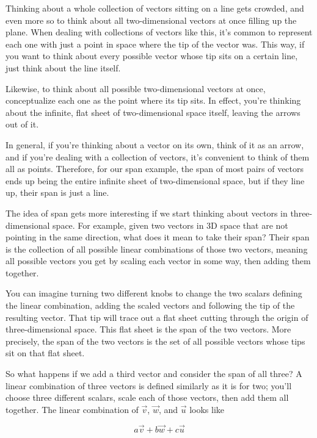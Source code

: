 Thinking about a whole collection of vectors sitting on a line gets crowded, and
even more so to think about all two-dimensional vectors at once filling up the
plane. When dealing with collections of vectors like this, it's common to
represent each one with just a point in space where the tip of the vector was.
This way, if you want to think about every possible vector whose tip sits on a
certain line, just think about the line itself.

Likewise, to think about all possible two-dimensional vectors at once,
conceptualize each one as the point where its tip sits. In effect, you're
thinking about the infinite, flat sheet of two-dimensional space itself, leaving
the arrows out of it.

In general, if you're thinking about a vector on its own, think of it as an
arrow, and if you're dealing with a collection of vectors, it's convenient to
think of them all as points. Therefore, for our span example, the span of most
pairs of vectors ends up being the entire infinite sheet of two-dimensional
space, but if they line up, their span is just a line.

The idea of span gets more interesting if we start thinking about vectors in
three-dimensional space. For example, given two vectors in 3D space that are not
pointing in the same direction, what does it mean to take their span? Their span
is the collection of all possible linear combinations of those two vectors,
meaning all possible vectors you get by scaling each vector in some way, then
adding them together.

You can imagine turning two different knobs to change the two scalars defining
the linear combination, adding the scaled vectors and following the tip of the
resulting vector. That tip will trace out a flat sheet cutting through the
origin of three-dimensional space. This flat sheet is the span of the two
vectors. More precisely, the span of the two vectors is the set of all possible
vectors whose tips sit on that flat sheet.

So what happens if we add a third vector and consider the span of all three? A
linear combination of three vectors is defined similarly as it is for two;
you'll choose three different scalars, scale each of those vectors, then add
them all together. The linear combination of $\vec{v}$, $\vec{w}$, and $\vec{u}$
looks like

\begin{equation*}
  a\vec{v} + b\vec{w} + c\vec{u}
\end{equation*}


